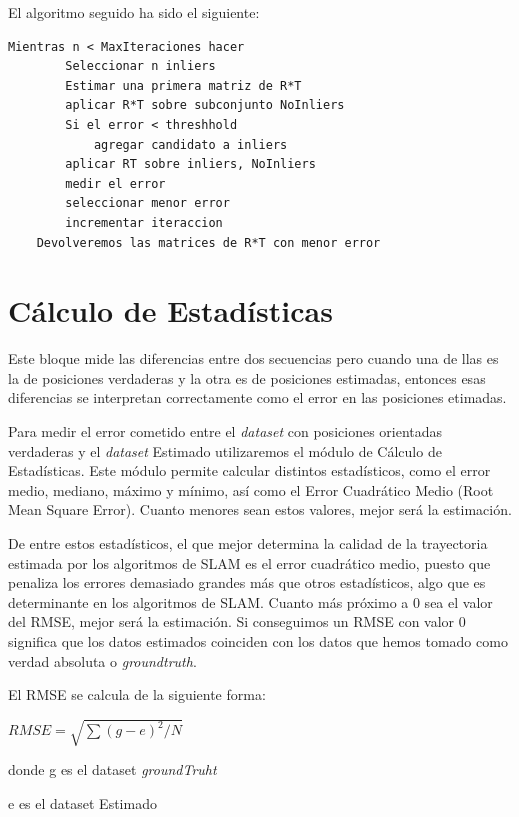 El algoritmo seguido ha sido el siguiente:
    \begin{lstlisting}[frame=single]
	Mientras n < MaxIteraciones hacer
		Seleccionar n inliers
		Estimar una primera matriz de R*T
		aplicar R*T sobre subconjunto NoInliers
		Si el error < threshhold
			agregar candidato a inliers
		aplicar RT sobre inliers, NoInliers
		medir el error 
		seleccionar menor error
		incrementar iteraccion
	Devolveremos las matrices de R*T con menor error
	\end{lstlisting}
	        
   

\section{Cálculo de Estadísticas}

Este bloque mide las diferencias entre dos secuencias pero cuando una de llas es la de posiciones verdaderas y la otra es de posiciones estimadas, entonces esas diferencias se interpretan correctamente como el error en las posiciones etimadas.

Para medir el error cometido entre el \textit{dataset} con posiciones orientadas verdaderas y el \textit{dataset} Estimado utilizaremos el módulo de Cálculo de Estadísticas.
Este módulo permite calcular distintos estadísticos, como el error medio, mediano, máximo y mínimo, así como el Error Cuadrático Medio (Root Mean Square Error).
Cuanto menores sean estos valores, mejor será la estimación.

De entre estos estadísticos, el que mejor determina la calidad de la trayectoria estimada por los algoritmos de SLAM es el error cuadrático medio, puesto que penaliza los errores demasiado grandes más que otros estadísticos, algo que es determinante en los algoritmos de SLAM. Cuanto más próximo a 0 sea el valor del RMSE, mejor será la estimación. Si conseguimos un RMSE con valor 0 significa que los datos estimados coinciden con los datos que hemos tomado como verdad absoluta o \textit{groundtruth}.

El RMSE se calcula de la siguiente forma:
\begin{center}
\begin{math}
RMSE =\sqrt{\sum{( g - e)^2}/N}
\end{math}
\end{center}

donde g es el dataset \textit{groundTruht}

      e es el dataset Estimado

